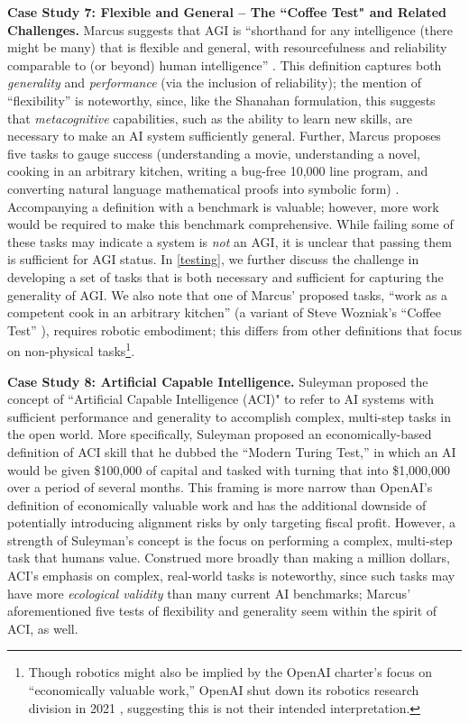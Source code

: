 \documentclass{article}
\theoremstyle{plain}
\theoremstyle{definition}
\theoremstyle{remark}
\begin{document}
\textbf{Case Study 7: Flexible and General -- The ``Coffee Test" and Related Challenges.} Marcus suggests that AGI is “shorthand for any intelligence (there might be many) that is flexible and general, with resourcefulness and reliability comparable to (or beyond) human intelligence” \citep{marcusTwitter}. This definition captures both \textit{generality} and \textit{performance} (via the inclusion of reliability); the mention of “flexibility” is noteworthy, since, like the Shanahan formulation, this suggests that \textit{metacognitive} capabilities, such as the ability to learn new skills, are necessary to make an AI system sufficiently general. 
Further, Marcus proposes five tasks to gauge success (understanding a movie, understanding a novel, cooking in an arbitrary kitchen, writing a bug-free 10,000 line program, and converting natural language mathematical proofs into symbolic form) \citep{marcusBlog}. Accompanying a definition with a benchmark is valuable; however, more work would be required to 
make this benchmark comprehensive.
While failing some of these tasks may indicate a system is \textit{not} an AGI, it is unclear that passing them is sufficient for AGI status. In \cref{testing}, we further discuss the challenge in developing a set of tasks that is both necessary and sufficient for capturing the generality of AGI. We also note that one of Marcus’ proposed tasks, “work as a competent cook in an arbitrary kitchen” (a variant of Steve Wozniak’s “Coffee Test” \citep{wozVideo}), requires robotic embodiment; this differs from other definitions that focus on non-physical tasks\footnote{Though robotics might also be implied by the OpenAI charter's focus on “economically valuable work,” OpenAI shut down its robotics research division in 2021 \citep{roboticsCut}, suggesting this is not their intended interpretation.}. 

\textbf{Case Study 8: Artificial Capable Intelligence.} Suleyman proposed the concept of ``Artificial Capable Intelligence (ACI)" \citep{comingWave} to refer to AI systems with sufficient performance and generality to accomplish complex, multi-step tasks in the open world. More specifically, Suleyman proposed an economically-based definition of ACI skill that he dubbed the “Modern Turing Test,” in which an AI would be given \$100,000 of capital and tasked with turning that into \$1,000,000 over a period of several months. This framing is more narrow than OpenAI’s definition of economically valuable work and has the additional downside of potentially introducing alignment risks \citep{kenton2021alignment} by only targeting fiscal profit. However, a strength of Suleyman’s concept is the focus on performing a complex, multi-step task that humans value. Construed more broadly than making a million dollars, ACI's emphasis on complex, real-world tasks is noteworthy, since such tasks may have more \emph{ecological validity} than many current AI benchmarks; Marcus' aforementioned five tests of flexibility and generality \citep{marcusBlog} seem within the spirit of ACI, as well.
\end{document}
